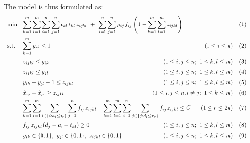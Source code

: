 \documentclass[preprint,12pt,authoryear]{elsarticle}
\begin{document}
\noindent
The model is thus formulated as: \\
\begin{equation*}
\begin{array}{ll@{}ll}
\text{min}  & \displaystyle\sum\limits^{m}_{k=1} \sum^{m}_{l=1} \sum^{n}_{i=1} \sum^{n}_{j=1} c_{kl} \, t_{kl} \, z_{ijkl} \ + \ \sum^{n}_{i=1} \sum^{n}_{j=1} p_{ij} \, f_{ij} \left( 1-\sum^{m}_{k=1} \sum^{m}_{l=1} z_{ijkl} \right) & \quad  (1) \vspace{2mm}\\
%
\text{s.t.}   & \displaystyle\sum\limits^{m}_{k=1} y_{ik} \leq 1  \hfill (1\le i \le n) & \quad (2) \vspace{2mm}\\
                    & z_{ijkl} \leq y_{ik}   \hfill  (1\le i,j \le n;\ 1\le k,l \le m) & \quad (3) \vspace{2mm}\\
                    & z_{ijkl} \leq y_{jl}   \hfill  (1\le i,j \le n;\ 1\le k,l \le m) & \quad (4) \vspace{2mm}\\
                    & y_{ik} + y_{jl} - 1 \leq z_{ijkl}   \hfill  (1\le i,j \le n;\ 1\le k,l \le m) & \quad (5) \vspace{2mm}\\
                    & \hat{x}_{ij} + \hat{x}_{ji} \geq z_{ijkk}   \hfill  (1\le i,j \le n, i \neq j;\ 1\le k \le m)  & \quad (6) \vspace{2mm}\\
                    & \displaystyle\sum\limits_{k=1}^{m} \sum_{l=1}^{m} \sum_{i\in\{i:a_{i} \le \tau_r\}} \sum_{j=1}^{n} f_{ij} \, z_{ijkl}- \sum_{k=1}^{m} \sum_{l=1}^{m} \sum_{i=1}^{n} \sum_{j\in\{j:d_{j} \le \tau_r\}} f_{ij} \, z_{ijkl} \le C \hspace{6mm}  \hfill (1\le r \le 2n) & \quad (7) \vspace{2mm}\\ 
                    & f_{ij} \, z_{ijkl} \, (d_{j} - a_{i} - t_{kl}) \ge 0   \hfill  (1\le i,j \le n;\ 1\le k,l \le m) & \quad (8) \vspace{2mm}\\
                    & y_{ik} \in \{0,1\}, \ y_{jl} \in \{0,1\}, \ z_{ijkl} \in \{0,1\}   \hfill  (1\le i,j \le n;\ 1\le k,l \le m) &  \quad (9) \\
\end{array}
\end{equation*}
\end{document}
